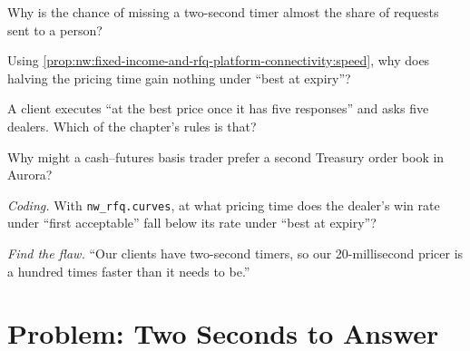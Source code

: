 \begin{exercise}[$\star$]\label{exo:nw:fixed-income-and-rfq-platform-connectivity:3}
Why is the chance of missing a two-second timer almost the share of requests sent to a person?
\end{exercise}

\begin{exercise}[$\star\star$]\label{exo:nw:fixed-income-and-rfq-platform-connectivity:4}
Using \cref{prop:nw:fixed-income-and-rfq-platform-connectivity:speed}, why does halving the pricing time gain nothing under ``best at
expiry''?
\end{exercise}

\begin{exercise}[$\star\star$]\label{exo:nw:fixed-income-and-rfq-platform-connectivity:5}
A client executes ``at the best price once it has five responses'' and asks five dealers. Which of the chapter's rules is that?
\end{exercise}

\begin{exercise}[$\star\star$]\label{exo:nw:fixed-income-and-rfq-platform-connectivity:6}
Why might a cash--futures basis trader prefer a second Treasury order book in Aurora?
\end{exercise}

\begin{exercise}[$\star\star\star$]\label{exo:nw:fixed-income-and-rfq-platform-connectivity:7}
\emph{Coding.} With \texttt{nw\_rfq.curves}, at what pricing time does the dealer's win rate under ``first acceptable'' fall below its
rate under ``best at expiry''?
\end{exercise}

\begin{exercise}[$\star\star\star$]\label{exo:nw:fixed-income-and-rfq-platform-connectivity:8}
\emph{Find the flaw.} ``Our clients have two-second timers, so our 20-millisecond pricer is a hundred times faster than it needs to be.''
\end{exercise}

\section{Problem: Two Seconds to Answer}

